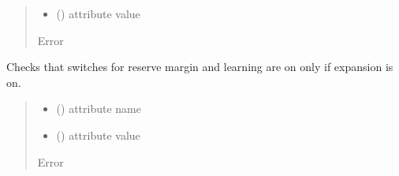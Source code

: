 \documentclass[letterpaper,10pt,english]{sphinxmanual}
\begin{document}
\begin{fulllineitems}
\begin{fulllineitems}
\begin{quote}
\begin{description}
\begin{itemize}
\item {} 
\sphinxAtStartPar
{} () \textendash{} attribute value

\end{itemize}

\sphinxAtStartPar
{} \textendash{} Error

\end{description}\end{quote}

\end{fulllineitems}


\begin{fulllineitems}
\label{\detokenize{src.common.config_setup:src.common.config_setup.Config_settings._check_elec_expansion_settings}}
\pysigstartsignatures
\pysiglinewithargsret
{}
{\sphinxparamcomma {}}
{}
\pysigstopsignatures
\sphinxAtStartPar
Checks that switches for reserve margin and learning are on only if expansion is on.
\begin{quote}\begin{description}
\begin{itemize}
\item {} 
\sphinxAtStartPar
{} () \textendash{} attribute name

\item {} 
\sphinxAtStartPar
{} () \textendash{} attribute value

\end{itemize}

\sphinxAtStartPar
{} \textendash{} Error

\end{description}\end{quote}

\end{fulllineitems}


\end{fulllineitems}
\end{document}

